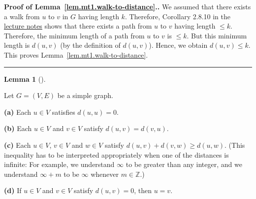 \documentclass[numbers=enddot,12pt,final,onecolumn,notitlepage]{scrartcl}%
\theoremstyle{definition}
\newtheorem{lem}[theo]{Lemma}
\newenvironment{lemma}[1][]
{\begin{lem}[#1]\begin{leftbar}}
{\end{leftbar}\end{lem}}
\newenvironment{proof}[1][Proof]{\noindent\textbf{#1.} }{\ \rule{0.5em}{0.5em}}
\newcommand{\ZZ}{\mathbb{Z}}
\newcommand{\tup}[1]{\left( #1 \right)}
\begin{document}
\begin{proof}[Proof of Lemma~\ref{lem.mt1.walk-to-distance}.]
We assumed that there exists a walk from $u$ to $v$ in $G$ having
length $k$. Therefore, Corollary 2.8.10 in the
\href{http://www.cip.ifi.lmu.de/~grinberg/t/17s/nogra.pdf}{lecture notes}
shows that there exists a path from $u$ to $v$ having length
$\leq k$. Therefore, the minimum length of a path from $u$ to $v$
is $\leq k$. But this minimum length is $d \tup{u, v}$ (by the
definition of $d \tup{u, v}$). Hence, we obtain
$d \tup{u, v} \leq k$. This proves
Lemma~\ref{lem.mt1.walk-to-distance}.
\end{proof}

\begin{lemma} \label{lem.mt1.distances-metric}
Let $G = \tup{V, E}$ be a simple graph.

\textbf{(a)} Each $u \in V$ satisfies $d \tup{u, u} = 0$.

\textbf{(b)} Each $u \in V$ and $v \in V$ satisfy
$d \tup{u, v} = d \tup{v, u}$.

\textbf{(c)} Each $u \in V$, $v \in V$ and $w \in V$ satisfy
$d \tup{u, v} + d \tup{v, w} \geq d \tup{u, w}$.
(This inequality has to be interpreted appropriately when one of the
distances is infinite: For example, we understand $\infty$ to be
greater than any integer, and we understand $\infty + m$ to be
$\infty$ whenever $m \in \ZZ$.)

\textbf{(d)} If $u \in V$ and $v \in V$ satisfy $d \tup{u, v} = 0$,
then $u = v$.
\end{lemma}
\end{document}
